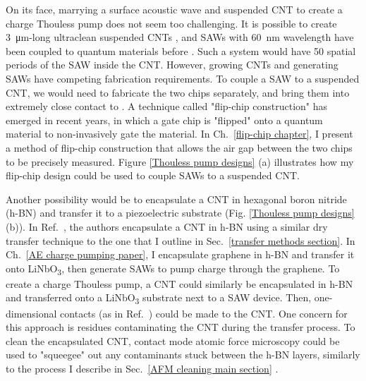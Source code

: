 \documentclass[double,12pt,1in,seploa]{beavtex}
\begin{document}
On its face, marrying a surface acoustic wave and suspended CNT to create a charge Thouless pump does not seem too challenging. It is possible to create \SI{3}{\micro\meter}-long ultraclean suspended CNTs \cite{senger_universal_2018}, and SAWs with \SI{60}{\nano\meter} wavelength have been coupled to quantum materials before \cite{kukushkin_collective_2011}. Such a system would have 50 spatial periods of the SAW inside the CNT. However, growing CNTs and generating SAWs have competing fabrication requirements. To couple a SAW to a suspended CNT, we would need to fabricate the two chips separately, and bring them into extremely close contact to . A technique called "flip-chip construction" has emerged in recent years, in which a gate chip is "flipped" onto a quantum material to non-invasively gate the material. In Ch.\ \ref{flip-chip chapter}, I present a method of flip-chip construction that allows the air gap between the two chips to be precisely measured. Figure \ref{Thouless pump designs} (a) illustrates how my flip-chip design could be used to couple SAWs to a suspended CNT.

Another possibility would be to encapsulate a CNT in hexagonal boron nitride (h-BN) and transfer it to a piezoelectric substrate (Fig. \ref{Thouless pump designs} (b)). In Ref.\ \cite{huang_superior_2015}, the authors encapsulate a CNT in h-BN using a similar dry transfer technique to the one that I outline in Sec.\ \ref{transfer methods section}. In Ch.\ \ref{AE charge pumping paper}, I encapsulate graphene in h-BN and transfer it onto LiNbO\textsubscript{3}, then generate SAWs to pump charge through the graphene. To create a charge Thouless pump, a CNT could similarly be encapsulated in h-BN and transferred onto a LiNbO\textsubscript{3} substrate next to a SAW device. Then, one-dimensional contacts (as in Ref.\ \cite{huang_superior_2015}) could be made to the CNT. One concern for this approach is residues contaminating the CNT during the transfer process. To clean the encapsulated CNT, contact mode atomic force microscopy could be used to "squeegee" out any contaminants stuck between the h-BN layers, similarly to the process I describe in Sec.\ \ref{AFM cleaning main section} \cite{goossens_mechanical_2012,chen_tip-based_2021}. 
\end{document}
